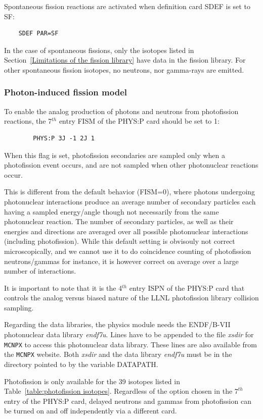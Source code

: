 Spontaneous fission reactions are activated when definition card SDEF is set to SF:
\begin{verbatim}
	SDEF PAR=SF
\end{verbatim}

In the case of spontaneous fissions, only the isotopes listed in Section~\ref{Limitations of the fission library} have data in the fission library. For other spontaneous fission isotopes, no neutrons, nor gamma-rays are emitted.

\subsubsection*{Photon-induced fission model}

To enable the analog production of photons and neutrons from photofission reactions, the 7$^{th}$ entry FISM of the PHYS:P card should be set to 1:
\begin{verbatim}
        PHYS:P 3J -1 2J 1
\end{verbatim}
When this flag is set, photofission secondaries are sampled only when a photofission event occurs, and are not sampled when other photonuclear reactions occur.

This is different from the default behavior (FISM=0), where photons undergoing photonuclear interactions produce an average number of secondary particles each having a sampled energy/angle though not necessarily from the same photonuclear reaction. The number of secondary particles, as well as their energies and directions are averaged over all possible photonuclear interactions (including photofission). While this default setting is obvisouly not correct microscopically, and we cannot use it to do coincidence counting of photofission neutrons/gammas for instance, it is however correct on average over a large number of interactions.

It is important to note that it is the 4$^{th}$ entry ISPN of the PHYS:P card that controls the analog versus biased nature of the LLNL photofission library collision sampling.

Regarding the data libraries, the physics module needs the ENDF/B-VII photonuclear data library \textit{endf7u}. Lines have to be appended to the file \textit{xsdir} for {\tt MCNPX} to access this photonuclear data library. These lines are also available from the {\tt MCNPX} website. Both \textit{xsdir} and the data library \textit{endf7u} must be in the directory pointed to by the variable DATAPATH.

Photofission is only available for the 39 isotopes listed in Table~\ref{table:photofission isotopes}. Regardless of the option chosen in the $7^{th}$ entry of the PHYS:P card, delayed neutrons and gammas from photofission can be turned on 
and off independently via a different card.

